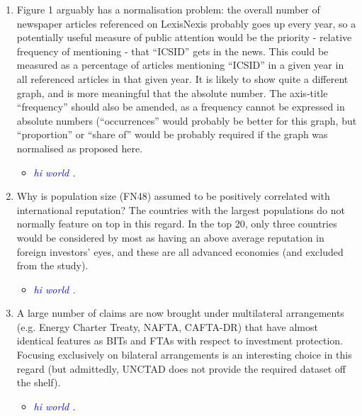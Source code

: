 \begin{enumerate}
\begin{itemize}
	\end{itemize}
	\item Figure 1 arguably has a normalisation problem: the overall number of newspaper articles referenced on LexisNexis probably goes up every year, so a potentially useful measure of public attention would be the priority - relative frequency of mentioning - that ``ICSID'' gets in the news. This could be measured as a percentage of articles mentioning ``ICSID'' in a given year in all referenced articles in that given year. It is likely to show quite a different graph, and is more meaningful that the absolute number. The axis-title ``frequency'' should also be amended, as a frequency cannot be expressed in absolute numbers (``occurrences'' would probably be better for this graph, but ``proportion'' or ``share of'' would be probably required if the graph was normalised as proposed here. 	
	\begin{itemize}
		\item \textcolor{blue}{ \emph{ hi world . }}
	\end{itemize}
	\item Why is population size (FN48) assumed to be positively correlated with international reputation? The countries with the largest populations do not normally feature on top in this regard. In the top 20, only three countries would be considered by most as having an above average reputation in foreign investors' eyes, and these are all advanced economies (and excluded from the study). 
	\begin{itemize}
		\item \textcolor{blue}{ \emph{ hi world . }}
	\end{itemize}
	\item A large number of claims are now brought under multilateral arrangements (e.g. Energy Charter Treaty, NAFTA, CAFTA-DR) that have almost identical features as BITs and FTAs with respect to investment protection. Focusing exclusively on bilateral arrangements is an interesting choice in this regard (but admittedly, UNCTAD does not provide the required dataset off the shelf). 		
	\begin{itemize}
		\item \textcolor{blue}{ \emph{ hi world . }}
	\end{itemize}	
\end{enumerate}

